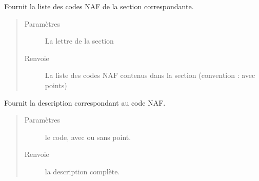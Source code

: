 \documentclass[letterpaper,10pt,french]{sphinxmanual}
\begin{document}
\begin{fulllineitems}
\label{\detokenize{index:src.clusterizer.utils.NAF_utils.get_NAFs_by_section}}
\sphinxAtStartPar
Fournit la liste des codes NAF de la section correspondante.
\begin{quote}\begin{description}
\item[{Paramètres}] \leavevmode
\sphinxAtStartPar
{} \textendash{} La lettre de la section

\item[{Renvoie}] \leavevmode
\sphinxAtStartPar
La liste des codes NAF contenus dans la section (convention : avec points)

\end{description}\end{quote}

\end{fulllineitems}


\begin{fulllineitems}
\label{\detokenize{index:src.clusterizer.utils.NAF_utils.get_description}}
\sphinxAtStartPar
Fournit la description correspondant au code NAF.
\begin{quote}\begin{description}
\item[{Paramètres}] \leavevmode
\sphinxAtStartPar
{} \textendash{} le code, avec ou sans point.

\item[{Renvoie}] \leavevmode
\sphinxAtStartPar
la description complète.

\end{description}\end{quote}

\end{fulllineitems}
\end{document}
